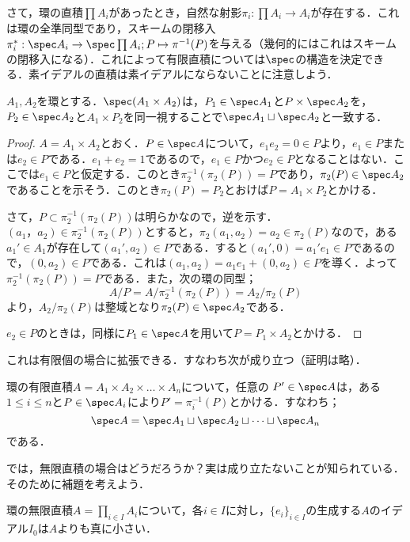 さて，環の直積$\prod A_i$があったとき，自然な射影$\pi_i:\prod A_i\to A_i$が存在する．これは環の全準同型であり，スキームの閉移入$\pi_i^\ast:\spec A_i\to\spec\prod A_i;P\mapsto \pi^{-1}(P)$を与える（幾何的にはこれはスキームの閉移入になる）．これによって有限直積については$\spec$の構造を決定できる．素イデアルの直積は素イデアルにならないことに注意しよう．
\begin{prop}
	$A_1,A_2$を環とする．$\spec (A_1\times A_2)$は，$P_1\in\spec A_1$と$P\times \spec A_2$を，$P_2\in\spec A_2$と$A_1\times P_2$を同一視することで$\spec A_1\sqcup\spec A_2$と一致する．
\end{prop}

\begin{proof}
	$A=A_1\times A_2$とおく．$P\in\spec A$について，$e_1e_2=0\in P$より，$e_1\in P$または$e_2\in P$である．$e_1+e_2=1$であるので，$e_1\in P$かつ$e_2\in P$となることはない．ここでは$e_1\in P$と仮定する．このとき$\pi_2^{-1}(\pi_2(P))=P$であり，$\pi_2(P)\in\spec A_2$であることを示そう．このとき$\pi_2(P)=P_2$とおけば$P=A_1\times P_2$とかける．
	
	さて，$P\subset\pi_2^{-1}(\pi_2(P))$は明らかなので，逆を示す．$(a_1，a_2)
	\in\pi_2^{-1}(\pi_2(P))$とすると，$\pi_2(a_1,a_2)=a_2\in\pi_2(P)$なので，ある$a_1'\in A_1$が存在して$(a_1',a_2)\in P$である．すると$(a_1',0)=a_1'e_1\in P$であるので，$(0,a_2)\in P$である．これは$(a_1,a_2)=a_1e_1+(0,a_2)\in P$を導く．よって$\pi_2^{-1}(\pi_2(P))=P$である．また，次の環の同型；
	\[A/P=A/\pi_2^{-1}(\pi_2(P))=A_2/\pi_2(P)\]
	より，$A_2/\pi_2(P)$は整域となり$\pi_2(P)\in\spec A_2$である．
	
	$e_2\in P$のときは，同様に$P_1\in\spec A$を用いて$P=P_1\times A_2$とかける．
\end{proof}

これは有限個の場合に拡張できる．すなわち次が成り立つ（証明は略）．

\begin{prop}
	環の有限直積$A=A_1\times A_2\times\dots\times A_n$について，任意の $P'\in\spec A$は，ある$1\leq i\leq n$と$P\in\spec A_i$により$P'=\pi_i^{-1}(P)$とかける．すなわち；
	\[\spec A=\spec A_1\sqcup\spec A_2\sqcup\dots\sqcup\spec A_n\]
	である．
\end{prop}

では，無限直積の場合はどうだろうか？実は成り立たないことが知られている．そのために補題を考えよう．

\begin{lem}
	環の無限直積$A=\prod_{i\in I}A_i$について，各$i\in I$に対し，$\{e_i\}_{i\in I}$の生成する$A$のイデアル$I_0$は$A$よりも真に小さい．
\end{lem}

